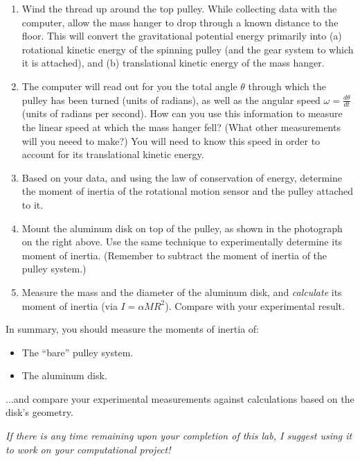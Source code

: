 \documentclass[11pt]{article}
\begin{document}
\begin{enumerate}
\begin{center}
\end{center}
\item Wind the thread up around the top pulley.  While collecting data with
the computer, allow the mass hanger to drop through a known distance to the 
floor.  This will convert the gravitational potential energy primarily 
into (a) rotational kinetic energy of the spinning pulley (and the gear system 
to which it is attached), and (b) translational kinetic energy of the mass 
hanger.  
\item The computer will read out for you the total angle $\theta$ through
which the pulley has been turned (units of radians), as well as the angular
speed $\omega = \frac{d \theta}{d t}$ (units of radians per second).  How can
you use this information to measure the linear speed at which the mass hanger
fell?  (What other measurements will you neeed to make?)  
You will need to know this speed in order to account for its translational 
kinetic energy.
\item Based on your data, and using the law of conservation of energy,  
determine the moment of inertia of the rotational motion sensor and the
pulley attached to it.  
\item Mount the aluminum disk on top of the pulley, as shown in the 
photograph on the right above.  Use the same technique to experimentally
determine its moment of inertia.  (Remember to 
subtract the moment of inertia of the pulley system.)
\item Measure the mass and the diameter of the aluminum disk, and 
{\em{calculate}} its moment of inertia (via $I = \alpha M R^2$).  Compare with your experimental result.
\end{enumerate}

\noindent In summary, you should measure the moments of inertia of:
\begin{itemize}
\item The ``bare'' pulley system.
\item The aluminum disk.
\end{itemize}
...and compare your experimental measurements against calculations based on 
the disk's geometry. 

\vspace{1in}

\textit{If there is any time remaining upon your completion of this lab, I suggest using it to work on your computational project!}
\end{document}
